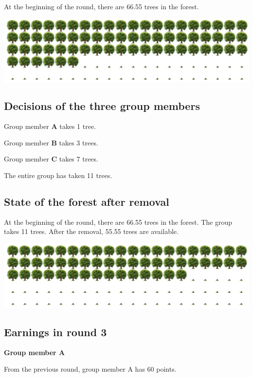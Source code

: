 \noindent At the beginning of the round, there are 66.55 trees in the forest.
\begin{center}
   \includegraphics[width=16cm]{../bld/graphs/A. Round3a.png}
\end{center}

\subsection*{Decisions of the three group members}

\noindent Group member \textbf{A} takes 1 tree.

\noindent Group member \textbf{B} takes 3 trees.

\noindent Group member \textbf{C} takes 7 trees.

\noindent The entire group has taken 11 trees.

\subsection*{State of the forest after removal}

\noindent At the beginning of the round, there are 66.55 trees in the forest. The group takes 11 trees. After the removal, 55.55 trees are available.
\begin{center}
   \includegraphics[width=16cm]{../bld/graphs/A. Round3b.png}
\end{center}

\subsection*{Earnings in round 3}

\noindent \textbf{Group member A}

\noindent From the previous round, group member A has 60 points.

